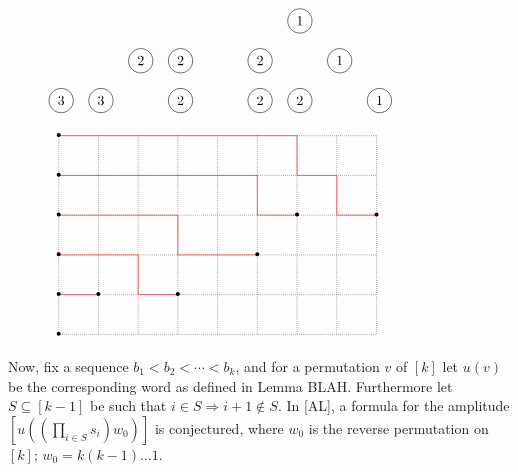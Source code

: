 \documentclass[reqno]{amsart}
\newcommand{\0}{\phantom{c}}
\let\prodnonlimits\prod
\renewcommand{\prod}{\prodnonlimits\limits}
\theoremstyle{plain}
\theoremstyle{definition}
\numberwithin{equation}{section}
\begin{document}
\begin{figure}
$\begin{tikzpicture}
  \node[circle,draw=black] at  (1, 0){3};
  \node[circle,draw=black] at  (2, 0){3};
  \node[circle,draw=black] at  (4, 0){2};
  \node[circle,draw=black] at  (6, 0){2};
  \node[circle,draw=black] at  (7, 0){2};
  \node[circle,draw=black] at  (9, 0){1};
  \node[circle,draw=black] at  (3, 1){2};
  \node[circle,draw=black] at  (4, 1){2};
  \node[circle,draw=black] at  (6, 1){2};
  \node[circle,draw=black] at  (8, 1){1};
  \node[circle,draw=black] at  (7, 2){1};
\end{tikzpicture}$

\vspace{1in}

$\begin{tikzpicture}
  \draw[densely dotted] (1, 1) -- (9, 1);
  \draw[densely dotted] (1, 2) -- (9, 2);
  \draw[densely dotted] (1, 3) -- (9, 3);
  \draw[densely dotted] (1, 4) -- (9, 4);
  \draw[densely dotted] (1, 5) -- (9, 5);
  \draw[densely dotted] (1, 6) -- (9, 6);

  \draw[densely dotted] (1, 6) -- (1, 1);
  \draw[densely dotted] (2, 6) -- (2, 1);
  \draw[densely dotted] (3, 6) -- (3, 1);
  \draw[densely dotted] (4, 6) -- (4, 1);
  \draw[densely dotted] (5, 6) -- (5, 1);
  \draw[densely dotted] (6, 6) -- (6, 1);
  \draw[densely dotted] (7, 6) -- (7, 1);
  \draw[densely dotted] (8, 6) -- (8, 1);
  \draw[densely dotted] (9, 6) -- (9, 1);

  \draw[draw=red] (1,2)--(2,2);
  \draw[draw=red] (1,3)--(3,3)--(3,2)--(4,2);
  \draw[draw=red] (1,4)--(4,4)--(4,3)--(6,3);
  \draw[draw=red] (1,5)--(6,5)--(6,4)--(7,4);
  \draw[draw=red] (1,6)--(7,6)--(7,5)--(8,5)--(8,4)--(9,4);

  \node at (1,1){\textbullet};
  \node at (1,2){\textbullet};
  \node at (1,3){\textbullet};
  \node at (1,4){\textbullet};
  \node at (1,5){\textbullet};
  \node at (1,6){\textbullet};
  \node at (2,2){\textbullet};
  \node at (4,2){\textbullet};
  \node at (6,3){\textbullet};
  \node at (7,4){\textbullet};
  \node at (9,4){\textbullet};
\end{tikzpicture}$

\end{figure}

Now, fix a sequence $b_1 < b_2 < \cdots < b_k$, and for a permutation $v$ of $[k]$ let $u(v)$ be the corresponding word as defined in Lemma BLAH. Furthermore let $S \subseteq [k-1]$ be such that $i\in S \Rightarrow i+1 \notin S$. In [AL], a formula for the amplitude $\left[ u((\prod_{i\in S} s_i)w_0) \right]$ is conjectured, where $w_0$ is the reverse permutation on $[k]$; $w_0 = k(k-1)\dots 1$.
\end{document}
